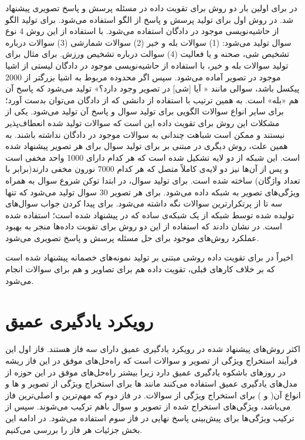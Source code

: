   در
  \cite{kafle2017data}
 برای اولین بار دو روش برای تقویت داده در مسئله پرسش و پاسخ تصویری پیشنهاد شد.  در روش اول برای تولید پرسش و پاسخ از الگو استفاده‌ می‌شود. برای تولید الگو از حاشیه‌نویسی 
 موجود در ‌دادگان استفاده‌ می‌شود. با استفاده از این روش 4 نوع سوال تولید می‌شود: (1) سوالات بله و خیر (2) سوالات شمارشی (3) سوالات درباره تشخیص شی، صحنه و یا فعالیت (4) سوالت درباره تشخیص ورزش. برای مثال برای تولید سوالات بله و خیر، با استفاده از حاشیه‌نویسی موجود در دادگان لیستی از اشیا موجود در تصویر آماده می‌شود. سپس اگر محدوده مربوط به اشیا بزرگتر از 2000 پیکسل باشد، سوالی مانند « آیا [شی] در تصویر وجود دارد؟» تولید می‌شود که پاسخ آن هم «بله» است. به همین ترتیب با استفاده از دانشی که از ‌دادگان می‌توان بدست آورد؛ برای سایر انواع سوالات الگویی برای تولید سوال و پاسخ آن تولید می‌شود. یکی از مشکلات این روش برای تقویت داده این است که سوالات تولید شده انعطاف‌‌پذیر نیستند و ممکن است شباهت چندانی به سوالات موجود در ‌دادگان نداشته باشند. به همین علت، روش دیگری در 
 \cite{kafle2017data}
 مبتنی بر 
 برای تولید سوال برای هر تصویر پیشنهاد شده است. این شبکه از دو لایه 
 تشکیل شده است که هر کدام دارای 1000 واحد مخفی است و پس از آن‌ها نیز دو لایه‌ی کاملاً متصل که هر کدام 7000 نورون مخفی دارند(برابر با تعداد واژگان) ساخته شده است. برای تولید سوال، در ابتدا توکن 
 شروع سوال به همراه ویژگی‌های تصویر به شبکه داده‌ می‌شود. برای هر تصویر 30 سوال تولید می‌شود که تنها سه تا از پرتکرارترین سوالات  نگه داشته می‌شود. برای پیدا کردن جواب سوال‌های تولیده شده توسط شبکه 
 از یک شبکه‌ی ساده
 که در 
 \cite{kafle2016answer}
  پیشنهاد شده است؛ استفاده شده است. در 
 \cite{kafle2017data}
  نشان دادند که استفاده از این دو روش برای تقوبت داده‌ها منجر به بهبود عملکرد روش‌های موجود برای حل مسئله پرسش و پاسخ تصویری می‌شود. 
  
  اخیراً در
 \cite{tang2020semantic}
 برای تقویت داده روشی مبتنی بر تولید نمونه‌های خصمانه
 پیشنهاد شده است که بر خلاف کارهای قبلی، تقویت داده هم برای تصاویر و هم برای سوالات انجام می‌شود.
 
 
\section{رویکرد یادگیری عمیق}
اکثر روش‌های پیشنهاد شده در رویکرد یادگیری عمیق دارای سه فاز هستند. فاز اول این فرآیند استخراج ویژگی از تصویر و سوالات است که راه‌حل‌های موفق در این فاز ریشه در روزهای باشکوه یادگیری عمیق دارد زیرا بیشتر راه‌حل‌های موفق در این حوزه از مدل‌های یادگیری عمیق استفاده می‌کنند مانند 
 ها برای استخراج ویژگی از  تصویر و 
  ها و انواع آن(
  و
  ) برای استخراج ویژگی از سوالات. در فاز دوم که مهم‌ترین و اصلی‌ترین فاز می‌باشد، ویژگی‌های استخراج شده از تصویر و سوال باهم ترکیب می‌شوند. سپس از ترکیب ویژگی‌ها برای پیش‌بینی پاسخ نهایی در فاز سوم استفاده می‌شود. در ادامه این بخش جزئیات هر فاز را بررسی می‌کنیم.

